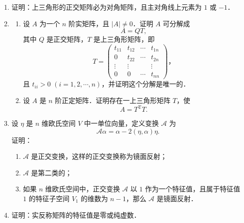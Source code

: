 \begin{enumerate}
  \ansproof
  \item 证明：上三角形的正交矩阵必为对角矩阵，且主对角线上元素为 $1$ 或 $-1$．

  \ansproof
  \item
  \begin{enumerate}
    \item 设 $A$ 为一个 $n$ 阶实矩阵，且 $|A|\ne 0$．证明 $A$ 可分解成
    \[
    A=QT,
    \]
    其中 $Q$ 是正交矩阵，$T$ 是上三角形矩阵，即
    \[
    T=\begin{pmatrix}
      t_{11} & t_{12} & \cdots & t_{1n} \\
      0 & t_{22} & \cdots & t_{2n} \\
      \vdots & \vdots & & \vdots \\
      0 & 0 & \cdots & t_{nn}
    \end{pmatrix}\text{，}
    \]
    且 $t_{ii}>0$ $(i=1,2,\cdots,n)$，并证明这个分解是唯一的．
  \anssub
    \item 设 $A$ 是 $n$ 阶正定矩阵．证明存在一上三角形矩阵 $T$，使
    \[
    A=T^{\mathrm{T}}T.
    \]
  \anssub
  \end{enumerate}

  \item 设 $\eta$ 是 $n$ 维欧氏空间 $V$ 中一单位向量，定义变换 $\mathcal{A}$ 为
  \[
  \mathcal{A}\alpha=\alpha-2(\eta,\alpha)\eta.
  \]
  证明：
  \begin{enumerate}
    \item $\mathcal{A}$ 是正交变换，这样的正交变换称为镜面反射；
  \anssub
    \item $\mathcal{A}$ 是第二类的；
  \anssub
    \item 如果 $n$ 维欧氏空间中，正交变换 $\mathcal{A}$ 以 $1$ 作为一个特征值，且属于特征值 $1$ 的特征子空间 $V_1$ 的维数为 $n-1$，那么 $\mathcal{A}$ 是镜面反射．
  \anssub
  \end{enumerate}

  \item 证明：实反称矩阵的特征值是零或纯虚数．


\end{enumerate}
